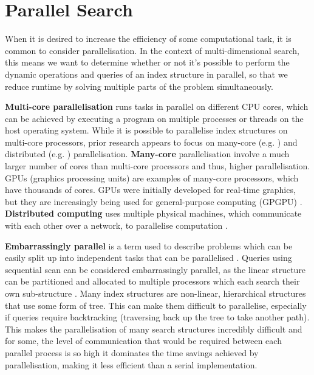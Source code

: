 \section{Parallel Search}

When it is desired to increase the efficiency of some computational task, it is common to consider parallelisation. In the context of multi-dimensional search, this means we want to determine whether or not it's possible to perform the dynamic operations and queries of an index structure in parallel, so that we reduce runtime by solving multiple parts of the problem simultaneously.

\textbf{Multi-core parallelisation} runs tasks in parallel on different CPU cores, which can be achieved by executing a program on multiple processes or threads on the host operating system. While it is possible to parallelise index structures on multi-core processors, prior research appears to focus on many-core (e.g. \cite{btree-gpu1, btree-gpu2, btree-gpu3, traversing-spatial-indexes-gpu, rtree-gpu1, rtree-gpu2}) and distributed (e.g. \cite{fat-btree, distributed-kd-tree, distributed-md-search}) parallelisation. \textbf{Many-core} parallelisation involve a much larger number of cores than multi-core processors and thus, higher parallelisation. GPUs (graphics processing units) are examples of many-core processors, which have thousands of cores. GPUs were initially developed for real-time graphics, but they are increasingly being used for general-purpose computing (GPGPU) \cite{performance-tuning-gpgpu}. \textbf{Distributed computing} uses multiple physical machines, which communicate with each other over a network, to parallelise computation \cite{distributed-systems}.

\textbf{Embarrassingly parallel} is a term used to describe problems which can be easily split up into independent tasks that can be parallelised \cite{designing-parallel-programs}. Queries using sequential scan can be considered embarrassingly parallel, as the linear structure can be partitioned and allocated to multiple processors which each search their own sub-structure \cite{gpu-gems-3}. Many index structures are non-linear, hierarchical structures that use some form of tree. This can make them difficult to parallelise, especially if queries require backtracking (traversing back up the tree to take another path). This makes the parallelisation of many search structures incredibly difficult and for some, the level of communication that would be required between each parallel process is so high it dominates the time savings achieved by parallelisation, making it less efficient than a serial implementation.

